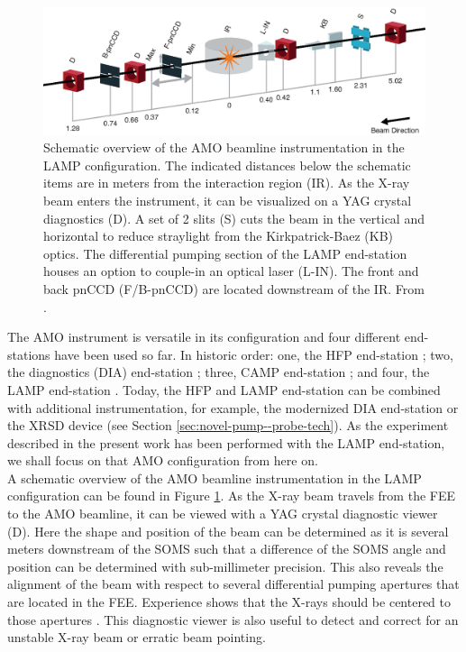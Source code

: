 \begin{figure}
	\centering
		\includegraphics[width=1.00\textwidth]{images/beam_layout.eps}
	\caption[Schematic overview of the AMO beamline instrumentation.]{Schematic overview of the AMO beamline instrumentation in the LAMP configuration. The indicated distances below the schematic items are in meters from the interaction region (IR). As the X-ray beam enters the instrument, it can be visualized on a YAG crystal diagnostics (D). A set of 2 slits (S) cuts the beam in the vertical and horizontal to reduce straylight from the Kirkpatrick-Baez (KB) optics. The differential pumping section of the LAMP end-station houses an option to couple-in an optical laser (L-IN). The front and back pnCCD (F/B-pnCCD) are located downstream of the IR. From \citep{Ferguson-2015-JSR}.}
	\label{fig:beam_layout}
\end{figure}
%
The AMO instrument is versatile in its configuration and four different end-stations have been used so far. In historic order: one, the HFP end-station \citep{Bozek-2009-EPJST,Bostedt-2013-JPB}; two, the diagnostics (DIA) end-station \citep{Bostedt-2013-JPB}; three, CAMP end-station \citep{Strueder-2010-NIMPA}; and four, the LAMP end-station \citep{Ferguson-2015-JSR,Bucher-2016-Unpublished}. Today, the HFP and LAMP end-station can be combined with additional instrumentation, for example, the modernized DIA end-station or the XRSD device (see Section \ref{sec:novel-pump--probe-tech}). As the experiment described in the present work has been performed with the LAMP end-station, we shall focus on that AMO configuration from here on.\\[1\baselineskip]
%
A schematic overview of the AMO beamline instrumentation in the LAMP configuration can be found in Figure \ref{fig:beam_layout}. As the X-ray beam travels from the FEE to the AMO beamline, it can be viewed with a YAG crystal diagnostic viewer (D). Here the shape and position of the beam can be determined as it is several meters downstream of the SOMS such that a difference of the SOMS angle and position can be determined with sub-millimeter precision. This also reveals the alignment of the beam with respect to several differential pumping apertures that are located in the FEE. Experience shows that the X-rays should be centered to those apertures \citep{Turner-2016-PC}. This diagnostic viewer is also useful to detect and correct for an unstable X-ray beam or erratic beam pointing.
